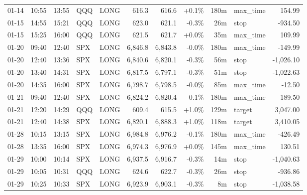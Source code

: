 \documentclass[11pt,a4paper,twoside]{article}
\begin{document}
\begin{center}
\begin{longtable}{>{\color{txtmain}}l l l l l r r r r >{\color{txtmain}}l r}
01-14 & 10:55 & 13:55 & QQQ & LONG & 616.3 & 616.6 & \textcolor{wingreen}{+0.1\%} & 180m & max\_time & \textcolor{wingreen}{154.99} \\
01-15 & 14:55 & 15:21 & QQQ & LONG & 623.0 & 621.1 & \textcolor{lossred}{-0.3\%} & 26m & stop & \textcolor{lossred}{-934.50} \\
01-15 & 15:25 & 16:00 & QQQ & LONG & 621.5 & 621.7 & \textcolor{wingreen}{+0.0\%} & 35m & max\_time & \textcolor{wingreen}{109.99} \\
01-20 & 09:40 & 12:40 & SPX & LONG & 6,846.8 & 6,843.8 & \textcolor{lossred}{-0.0\%} & 180m & max\_time & \textcolor{lossred}{-149.99} \\
01-20 & 12:40 & 13:36 & SPX & LONG & 6,840.6 & 6,820.1 & \textcolor{lossred}{-0.3\%} & 56m & stop & \textcolor{lossred}{-1,026.10} \\
01-20 & 13:40 & 14:31 & SPX & LONG & 6,817.5 & 6,797.1 & \textcolor{lossred}{-0.3\%} & 51m & stop & \textcolor{lossred}{-1,022.63} \\
01-20 & 14:35 & 16:00 & SPX & LONG & 6,798.7 & 6,798.5 & \textcolor{lossred}{-0.0\%} & 85m & max\_time & \textcolor{lossred}{-12.50} \\
01-21 & 09:40 & 12:40 & SPX & LONG & 6,824.2 & 6,820.4 & \textcolor{lossred}{-0.1\%} & 180m & max\_time & \textcolor{lossred}{-189.50} \\
01-21 & 12:20 & 14:29 & QQQ & LONG & 609.4 & 615.5 & \textcolor{wingreen}{+1.0\%} & 129m & target & \textcolor{wingreen}{3,047.00} \\
01-21 & 12:40 & 14:38 & SPX & LONG & 6,820.1 & 6,888.3 & \textcolor{wingreen}{+1.0\%} & 118m & target & \textcolor{wingreen}{3,410.05} \\
01-28 & 10:15 & 13:15 & SPX & LONG & 6,984.8 & 6,976.2 & \textcolor{lossred}{-0.1\%} & 180m & max\_time & \textcolor{lossred}{-426.49} \\
01-28 & 13:35 & 16:00 & SPX & LONG & 6,974.3 & 6,976.9 & \textcolor{wingreen}{+0.0\%} & 145m & max\_time & \textcolor{wingreen}{130.51} \\
01-29 & 10:00 & 10:14 & SPX & LONG & 6,937.5 & 6,916.7 & \textcolor{lossred}{-0.3\%} & 14m & stop & \textcolor{lossred}{-1,040.63} \\
01-29 & 10:05 & 10:31 & QQQ & LONG & 624.6 & 622.7 & \textcolor{lossred}{-0.3\%} & 26m & stop & \textcolor{lossred}{-936.86} \\
01-29 & 10:25 & 10:33 & SPX & LONG & 6,923.9 & 6,903.1 & \textcolor{lossred}{-0.3\%} & 8m & stop & \textcolor{lossred}{-1,038.58} \\

\end{longtable}
\end{center}
\end{document}
